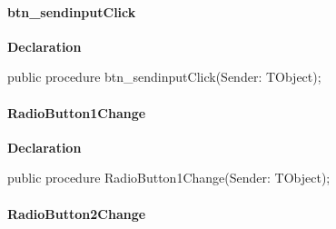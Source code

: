 \documentclass{report}
\newif\ifpdf
\begin{document}
\paragraph*{btn{\_}sendinputClick}\hspace*{\fill}

\label{mainunit.TIWizFrm-btn_sendinputClick}
\begin{list}{}{
\setlength{\itemindent}{0cm}
\setlength{\listparindent}{0cm}
\setlength{\leftmargin}{\evensidemargin}
\addtolength{\leftmargin}{\tmplength}
\settowidth{\labelsep}{X}
\addtolength{\leftmargin}{\labelsep}
\setlength{\labelwidth}{\tmplength}
}
\item[\textbf{Declaration}\hfill]
\ifpdf
\begin{flushleft}
\fi
\begin{ttfamily}
public procedure btn{\_}sendinputClick(Sender: TObject);\end{ttfamily}

\ifpdf
\end{flushleft}
\fi

\end{list}
\paragraph*{RadioButton1Change}\hspace*{\fill}

\label{mainunit.TIWizFrm-RadioButton1Change}
\begin{list}{}{
\setlength{\itemindent}{0cm}
\setlength{\listparindent}{0cm}
\setlength{\leftmargin}{\evensidemargin}
\addtolength{\leftmargin}{\tmplength}
\settowidth{\labelsep}{X}
\addtolength{\leftmargin}{\labelsep}
\setlength{\labelwidth}{\tmplength}
}
\item[\textbf{Declaration}\hfill]
\ifpdf
\begin{flushleft}
\fi
\begin{ttfamily}
public procedure RadioButton1Change(Sender: TObject);\end{ttfamily}

\ifpdf
\end{flushleft}
\fi

\end{list}
\paragraph*{RadioButton2Change}\hspace*{\fill}
\end{document}
